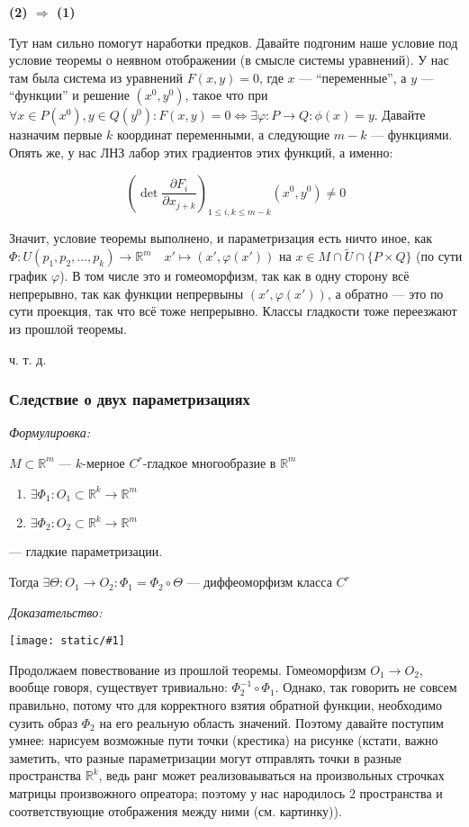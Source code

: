 \documentclass{article}
\def\image#1{\texttt{[image: static/\#1]}}
\begin{document}
\textbf{(2) $\Rightarrow$ (1)}

Тут нам сильно помогут наработки предков. Давайте подгоним наше условие под условие теоремы о неявном отображении (в смысле системы уравнений). У нас там была система из уравнений $F(x, y) = 0$, где $x$ --- ``переменные'', а $y$ --- ``функции'' и решение $(x^0, y^0)$, такое что при $\forall x \in P(x^0), y \in Q(y^0): F(x, y) = 0 \Leftrightarrow \exists \varphi: P \rightarrow Q: \phi(x) = y$. Давайте назначим первые $k$ координат переменными, а следующие $m - k$ --- функциями. Опять же, у нас ЛНЗ лабор этих градиентов этих функций, а именно: 

\[\left(\det \frac{\partial F_i}{\partial x_{j + k}}\right)_{1 \le i, k \le m - k}(x^0, y^0) \neq 0\]

Значит, условие теоремы выполнено, и параметризация есть ничто иное, как $\Phi: U(p_1, p_2, \ldots, p_k) \rightarrow \mathbb{R}^m \quad x' \mapsto (x', \varphi(x'))$ на $x \in M \cap \widetilde{U} \cap \{P \times Q\}$ (по сути график $\varphi$). В том числе это и гомеоморфизм, так как в одну сторону всё непрерывно, так как функции непрервыны $(x', \varphi(x'))$, а обратно --- это по сути проекция, так что всё тоже непрерывно. Классы гладкости тоже переезжают из прошлой теоремы.

ч. т. д.

\subsubsection{Следствие о двух параметризациях}
\textit{Формулировка:}

$M \subset \mathbb{R}^m$ --- $k$-мерное $C^r$-гладкое многообразие в $\mathbb{R}^m$

\begin{enumerate}
    \item $\exists \Phi_1: O_1 \subset \mathbb{R}^k \rightarrow \mathbb{R}^m$
    \item $\exists \Phi_2: O_2 \subset \mathbb{R}^k \rightarrow \mathbb{R}^m$
\end{enumerate}

--- гладкие параметризации.

Тогда $\exists \Theta: O_1 \rightarrow O_2: \Phi_1 = \Phi_2 \circ \Theta$ --- диффеоморфизм класса $C^r$

\textit{Доказательство:}

\image{sl_o_2_param.png}

Продолжаем повествование из прошлой теоремы. Гомеоморфизм $O_1 \rightarrow O_2$, вообще говоря, существует тривиально: $\Phi_2^{-1} \circ \Phi_1$. Однако, так говорить не совсем правильно, потому что для корректного взятия обратной функции, необходимо сузить образ $\Phi_2$ на его реальную область значений. Поэтому давайте поступим умнее: нарисуем возможные пути точки (крестика) на рисунке (кстати, важно заметить, что разные параметризации могут отправлять точки в разные пространства $\mathbb{R}^k$, ведь ранг может реализоваываться на произвольных строчках матрицы произвожного опреатора; поэтому у нас народилось 2 пространства и соответствующие отображения между ними (см. картинку)).
\end{document}
